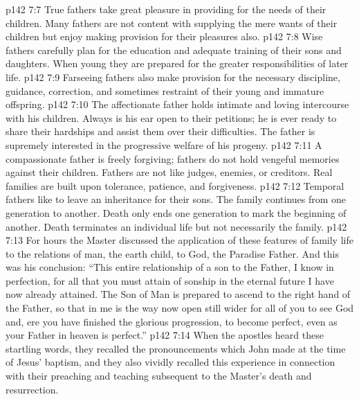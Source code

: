 \vs p142 7:7 \pc {}\bibnobreakspace {} True fathers take great pleasure in providing for the needs of their children. Many fathers are not content with supplying the mere wants of their children but enjoy making provision for their pleasures also.
\vs p142 7:8 \pc {}\bibnobreakspace {} Wise fathers carefully plan for the education and adequate training of their sons and daughters. When young they are prepared for the greater responsibilities of later life.
\vs p142 7:9 \pc {}\bibnobreakspace {} Farseeing fathers also make provision for the necessary discipline, guidance, correction, and sometimes restraint of their young and immature offspring.
\vs p142 7:10 \pc {}\bibnobreakspace {} The affectionate father holds intimate and loving intercourse with his children. Always is his ear open to their petitions; he is ever ready to share their hardships and assist them over their difficulties. The father is supremely interested in the progressive welfare of his progeny.
\vs p142 7:11 \pc {}\bibnobreakspace {} A compassionate father is freely forgiving; fathers do not hold vengeful memories against their children. Fathers are not like judges, enemies, or creditors. Real families are built upon tolerance, patience, and forgiveness.
\vs p142 7:12 \pc {}\bibnobreakspace {} Temporal fathers like to leave an inheritance for their sons. The family continues from one generation to another. Death only ends one generation to mark the beginning of another. Death terminates an individual life but not necessarily the family.
\vs p142 7:13 \pc For hours the Master discussed the application of these features of family life to the relations of man, the earth child, to God, the Paradise Father. And this was his conclusion: \textcolor{ubdarkred}{“This entire relationship of a son to the Father, I know in perfection, for all that you must attain of sonship in the eternal future I have now already attained. The Son of Man is prepared to ascend to the right hand of the Father, so that in me is the way now open still wider for all of you to see God and, ere you have finished the glorious progression, to become perfect, even as your Father in heaven is perfect.”}
\vs p142 7:14 When the apostles heard these startling words, they recalled the pronouncements which John made at the time of Jesus’ baptism, and they also vividly recalled this experience in connection with their preaching and teaching subsequent to the Master’s death and resurrection.

